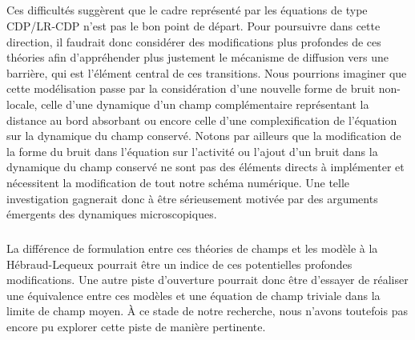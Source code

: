 \subparagraph{}Ces difficultés suggèrent que le cadre représenté par les équations de type CDP/LR-CDP n'est pas le bon point de départ. Pour poursuivre dans cette direction, il faudrait donc considérer des modifications plus profondes de ces théories afin d'appréhender plus justement le mécanisme de diffusion vers une barrière, qui est l'élément central de ces transitions. Nous pourrions imaginer que cette modélisation passe par la considération d'une nouvelle forme de bruit non-locale, celle d'une dynamique d'un champ complémentaire représentant la distance au bord absorbant ou encore celle d'une complexification de l'équation sur la dynamique du champ conservé. Notons par ailleurs que la modification de la forme du bruit dans l'équation sur l'activité ou l'ajout d'un bruit dans la dynamique du champ conservé ne sont pas des éléments directs à implémenter et nécessitent la modification de tout notre schéma numérique. Une telle investigation gagnerait donc à être sérieusement motivée par des arguments émergents des dynamiques microscopiques.

\subparagraph{}La différence de formulation entre ces théories de champs et les modèle à la Hébraud-Lequeux pourrait être un indice de ces potentielles profondes modifications. Une autre piste d'ouverture pourrait donc être d'essayer de réaliser une équivalence entre ces modèles et une équation de champ triviale dans la limite de champ moyen. \`A ce stade de notre recherche, nous n'avons toutefois pas encore pu explorer cette piste de manière pertinente.

\resumetocwriting